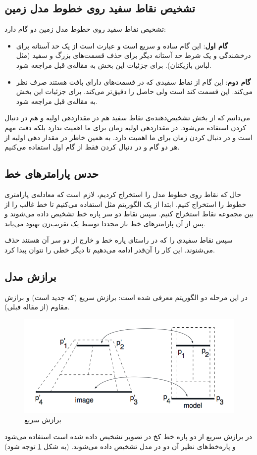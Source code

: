 \documentclass{report}
\begin{document}
\subsection{تشخیص نقاط سفید روی خطوط مدل زمین}
تشخیص نقاط سفید روی خطوط مدل زمین دو گام دارد:
\begin{itemize}
\item \textbf{گام اول}: 
این گام ساده و سریع است و عبارت است از یک حد آستانه برای درخشندگی و یک شرط حد آستانه دیگر برای حذف قسمت‌های بزرگ و سفید (مثل لباس بازیکنان). برای جزئیات این بخش به مقاله‌ی قبل مراجعه\cite{old_paper} شود.
\item \textbf{گام دوم}: 
این گام از نقاط سفیدی که در قسمت‌های دارای بافت هستند صرف نظر می‌کند. این قسمت کند است ولی حاصل را دقیق‌تر می‌کند. برای جزئیات این بخش به مقاله‌ی قبل مراجعه\cite{old_paper} شود.
\end{itemize}
می‌دانیم که از بخش تشخیص‌دهنده‌ی نقاط سفید هم در مقداردهی اولیه و هم در دنبال کردن استفاده می‌شود. در مقداردهی اولیه زمان برای ما اهمیت ندارد بلکه دقت مهم است و در دنبال کردن زمان برای ما اهمیت دارد. به همین خاطر در مقدار دهی اولیه از هر دو گام و در دنبال کردن فقط از گام اول استفاده می‌کنیم.
\subsection{حدس پارامترهای خط}
حال که نقاط روی خطوط مدل را استخراج کردیم، لازم است که معادله‌ی پارامتری خطوط را استخراج کنیم. ابتدا از یک الگوریتم مثل  استفاده می‌کنیم تا خط غالب را از بین مجموعه نقاط استخراج کنیم. سپس نقاط دو سر پاره خط تشخیص داده می‌شوند و پس از آن پارامترهای خط باز مجددا توسط یک تقریب‌زن  بهبود می‌یابد.

سپس نقاط سفیدی را که در راستای پاره خط و خارج از دو سر آن هستند حذف می‌شنوند. این کار را آن‌قدر ادامه می‌دهیم تا دیگر خطی را نتوان پیدا کرد.

\subsection{برازش مدل}
در این مرحله دو الگوریتم معرفی شده است: برازش سریع (که جدید است) و برازش مقاوم (از مقاله فبلی).
\begin{figure}
\centering
\includegraphics[scale=0.5]{fast_fitting.png}
\caption{برازش سریع}
\label{fast_fitting}
\end{figure}
در برازش سریع از دو پاره خط کخ در تصویر تشخیص داده شده است استفاده می‌شود و پاره‌خط‌های  نظیر آن دو در مدل تشخیص داده می‌شوند. (به شکل \ref{fast_fitting} توجه شود)
\end{document}
